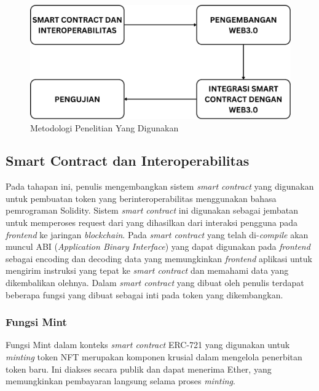 \begin{figure} [H] \centering
  \includegraphics[scale=0.35]{gambar/metodologi_new_2.png}
  \caption{Metodologi Penelitian Yang Digunakan}
  \label{fig:flowtransaksi}
\end{figure}

\subsection{Smart Contract dan Interoperabilitas}
Pada tahapan ini, penulis mengembangkan sistem \emph{smart contract} yang digunakan untuk pembuatan token yang berinteroperabilitas menggunakan bahasa pemrograman Solidity. Sistem \emph{smart contract} ini digunakan sebagai jembatan untuk memperoses request dari yang dihasilkan dari interaksi pengguna pada \emph{frontend} ke jaringan \emph{blockchain}. Pada \emph{smart contract} yang telah di-\emph{compile} akan muncul ABI (\emph{Application Binary Interface}) yang dapat digunakan pada \emph{frontend} sebagai encoding dan decoding data yang memungkinkan \emph{frontend} aplikasi untuk mengirim instruksi yang tepat ke \emph{smart contract} dan memahami data yang dikembalikan olehnya. Dalam \emph{smart contract} yang dibuat oleh penulis terdapat beberapa fungsi yang dibuat sebagai inti pada token yang dikembangkan.

\subsubsection{Fungsi Mint}
Fungsi Mint dalam konteks \emph{smart contract } ERC-721 yang digunakan untuk \emph{minting} token NFT merupakan komponen krusial dalam mengelola penerbitan token baru. Ini diakses secara publik dan dapat menerima Ether, yang memungkinkan pembayaran langsung selama proses \emph{minting}.

